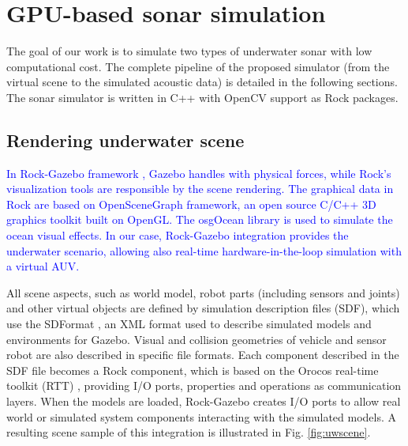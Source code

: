 \documentclass[final,5p,times]{elsarticle}
\begin{document}

\section{GPU-based sonar simulation}
\label{dev}

The goal of our work is to simulate two types of underwater sonar with low computational cost. The complete pipeline of the proposed simulator (from the virtual scene to the simulated acoustic data) is detailed in the following sections. The sonar simulator is written in C++ with OpenCV \cite{bradski2000} support as Rock packages.


\subsection{Rendering underwater scene}
\label{dev:uwscene}

\textcolor{blue}{In Rock-Gazebo framework \cite{watanabe2015}, Gazebo handles with physical forces, while Rock's visualization tools are responsible by the scene rendering. The graphical data in Rock are based on OpenSceneGraph framework, an open source C/C++ 3D graphics toolkit built on OpenGL. The osgOcean library is used to simulate the ocean visual effects. In our case, Rock-Gazebo integration provides the underwater scenario, allowing also real-time hardware-in-the-loop simulation with a virtual AUV.}

All scene aspects, such as world model, robot parts (including sensors and
joints) and other virtual objects are defined by simulation description files (SDF), which use the SDFormat \cite{sdformat2017}, an XML format used to describe simulated models and environments for Gazebo. Visual and collision geometries of vehicle and sensor robot are also described in specific file formats. Each component described in the SDF file becomes a Rock component, which is based on the Orocos real-time toolkit (RTT) \cite{soetens2005}, providing I/O ports, properties and operations as communication layers. When the models are loaded, Rock-Gazebo creates I/O ports to allow real world or simulated system components interacting with the simulated models. A resulting scene sample of this integration is illustrated in Fig. \ref{fig:uwscene}.

\end{document}
